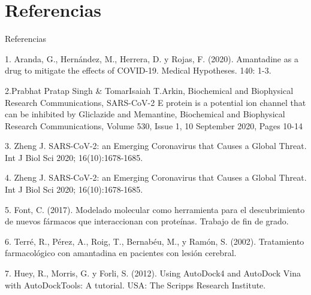\documentclass[11pt]{beamer}
\begin{document}
	

	
	
	\section{Referencias}
		\begin{frame}{Referencias}
			\justifying 
			
1. Aranda, G., Hernández, M., Herrera, D. y Rojas, F. (2020). Amantadine as a drug to mitigate the effects of COVID-19. Medical Hypotheses. 140: 1-3. 

2.Prabhat Pratap Singh & TomarIsaiah T.Arkin, Biochemical and Biophysical Research Communications, SARS-CoV-2 E protein is a potential ion channel that can be inhibited by Gliclazide and Memantine, Biochemical and Biophysical Research Communications, Volume 530, Issue 1, 10 September 2020, Pages 10-14

3. Zheng J. SARS-CoV-2: an Emerging Coronavirus that Causes a Global Threat. Int J Biol Sci 2020; 16(10):1678-1685. 

4. Zheng J. SARS-CoV-2: an Emerging Coronavirus that Causes a Global Threat. Int J Biol Sci 2020; 16(10):1678-1685. 

5. Font, C. (2017). Modelado molecular como herramienta para el descubrimiento de nuevos fármacos que interaccionan con proteínas. Trabajo de fin de grado. 

6. Terré, R., Pérez, A., Roig, T., Bernabéu, M., y Ramón, S. (2002). Tratamiento farmacológico con amantadina en pacientes con lesión cerebral. 

7. Huey, R., Morris, G. y Forli, S. (2012). Using AutoDock4 and AutoDock Vina with AutoDockTools: A tutorial. USA: The Scripps Research Institute. 
			
		\end{frame}
	
	
\end{document}
